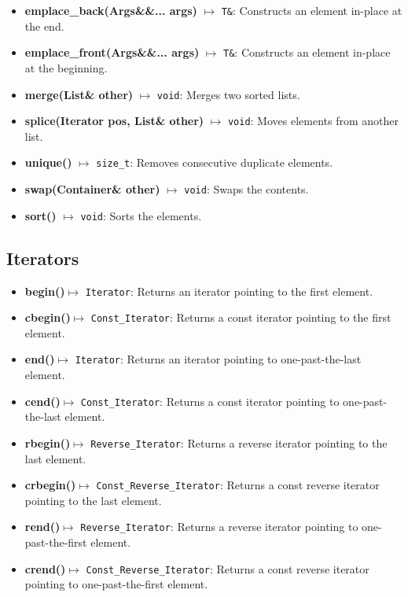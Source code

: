\documentclass{report}
\begin{document}
\begin{itemize}
        \item \textbf{emplace\_back(Args\&\&... args)} $\mapsto$ \texttt{T\&}: Constructs an element in-place at the end.
        \item \textbf{emplace\_front(Args\&\&... args)} $\mapsto$ \texttt{T\&}: Constructs an element in-place at the beginning.
        \item \textbf{merge(List\& other)} $\mapsto$ \texttt{void}: Merges two sorted lists.
        \item \textbf{splice(Iterator pos, List\& other)} $\mapsto$ \texttt{void}: Moves elements from another list.
        \item \textbf{unique()} $\mapsto$ \texttt{size\_t}: Removes consecutive duplicate elements.
        \item \textbf{swap(Container\& other)} $\mapsto$ \texttt{void}: Swaps the contents.
        \item \textbf{sort()} $\mapsto$ \texttt{void}: Sorts the elements.
    \end{itemize}

    \bigbreak \noindent 
    \subsection{Iterators}
    \begin{itemize}
         \item \textbf{begin()}\(\mapsto\) \texttt{Iterator}: Returns an iterator pointing to the first element.
        \item \textbf{cbegin()}\(\mapsto\) \texttt{Const\_Iterator}: Returns a const iterator pointing to the first element.
        \item \textbf{end()}\(\mapsto\) \texttt{Iterator}: Returns an iterator pointing to one-past-the-last element.
        \item \textbf{cend()}\(\mapsto\) \texttt{Const\_Iterator}: Returns a const iterator pointing to one-past-the-last element.
        \item \textbf{rbegin()}\(\mapsto\) \texttt{Reverse\_Iterator}: Returns a reverse iterator pointing to the last element.
        \item \textbf{crbegin()}\(\mapsto\) \texttt{Const\_Reverse\_Iterator}: Returns a const reverse iterator pointing to the last element.
        \item \textbf{rend()}\(\mapsto\) \texttt{Reverse\_Iterator}: Returns a reverse iterator pointing to one-past-the-first element.
        \item \textbf{crend()}\(\mapsto\) \texttt{Const\_Reverse\_Iterator}: Returns a const reverse iterator pointing to one-past-the-first element.
    \end{itemize}
\end{document}
